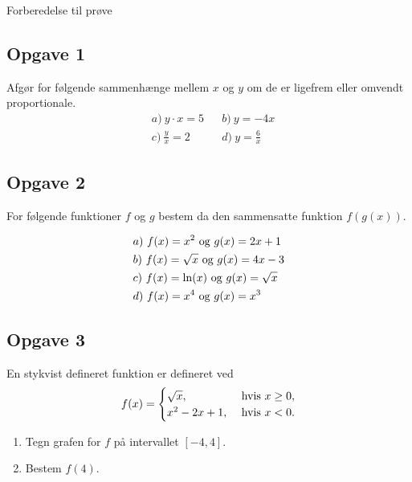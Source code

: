 \begin{center}
\Huge
Forberedelse til prøve
\end{center}

\subsection*{Opgave 1}

Afgør for følgende sammenhænge mellem $x$ og $y$ om de er ligefrem eller omvendt proportionale.
\begin{align*}
	&a) \ y\cdot x = 5 &&b) \  y = -4x   \\
	&c) \ \frac{y}{x} = 2  &&d) \ y = \frac{6}{x}   
\end{align*}


\subsection*{Opgave 2}

For følgende funktioner $f$ og $g$ bestem da den sammensatte funktion $f(g(x))$. 

\begin{align*}
	&a) \  f(x) = x^2 \textnormal{ og } g(x) = 2x+1\\
	&b) \  f(x) = \sqrt{x} \textnormal{ og } g(x) = 4x-3\\
	&c) \  f(x) = \ln(x) \textnormal{ og } g(x) = \sqrt{x}\\
	&d) \  f(x) = x^4 \textnormal{ og } g(x) = x^3\\
\end{align*}

\subsection*{Opgave 3}

En stykvist defineret funktion er defineret ved
\begin{align*}
	f(x) = 
	\begin{cases}
		\sqrt{x}, &\textnormal{ hvis } x \geq 0,\\
		x^2-2x+1, &\textnormal{ hvis } x < 0.		
	\end{cases}
\end{align*}

\begin{enumerate}[label=\roman*)]
	\item Tegn grafen for $f$ på intervallet $[-4,4]$.
	\item Bestem $f(4)$.
\end{enumerate}

